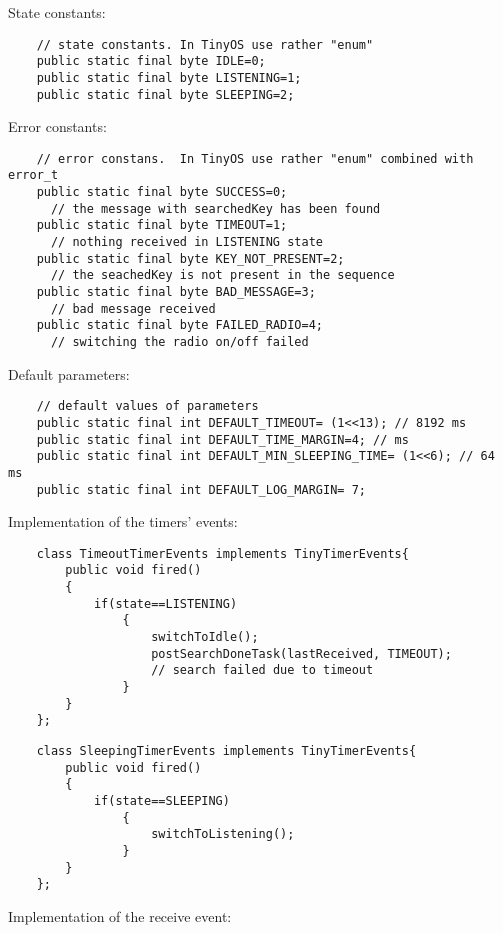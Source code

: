\documentclass{letter}
\begin{document}
State constants:
\begin{verbatim}
    // state constants. In TinyOS use rather "enum"
    public static final byte IDLE=0;
    public static final byte LISTENING=1;
    public static final byte SLEEPING=2;
\end{verbatim}
Error constants:
\begin{verbatim}
    // error constans.  In TinyOS use rather "enum" combined with error_t
    public static final byte SUCCESS=0;   
      // the message with searchedKey has been found
    public static final byte TIMEOUT=1; 
      // nothing received in LISTENING state
    public static final byte KEY_NOT_PRESENT=2; 
      // the seachedKey is not present in the sequence
    public static final byte BAD_MESSAGE=3; 
      // bad message received
    public static final byte FAILED_RADIO=4; 
      // switching the radio on/off failed
\end{verbatim}
Default parameters:
\begin{verbatim}
    // default values of parameters
    public static final int DEFAULT_TIMEOUT= (1<<13); // 8192 ms
    public static final int DEFAULT_TIME_MARGIN=4; // ms
    public static final int DEFAULT_MIN_SLEEPING_TIME= (1<<6); // 64 ms
    public static final int DEFAULT_LOG_MARGIN= 7; 
\end{verbatim}
Implementation of the timers' events:
\begin{verbatim}
    class TimeoutTimerEvents implements TinyTimerEvents{
        public void fired()
        {
            if(state==LISTENING)
                {
                    switchToIdle();
                    postSearchDoneTask(lastReceived, TIMEOUT); 
                    // search failed due to timeout
                }
        }
    };
\end{verbatim}
\begin{verbatim}
    class SleepingTimerEvents implements TinyTimerEvents{
        public void fired()
        {
            if(state==SLEEPING)
                {
                    switchToListening();
                }
        }
    };
\end{verbatim}
Implementation of the receive event:
\end{document}
